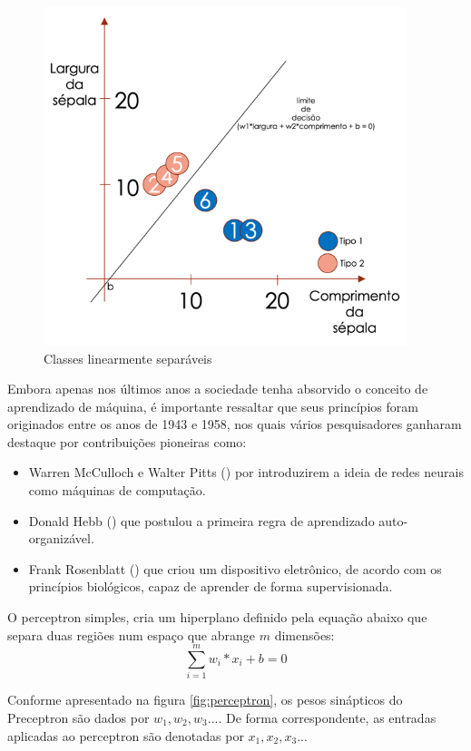 \begin{figure}[H]
  \centering
  \includegraphics[width=300pt]{figuras/classes_linearmente_separaveis.png}
  \caption{Classes linearmente separáveis}
  \label{fig:classes_separadas}
\end{figure}

Embora apenas nos últimos anos a sociedade tenha absorvido o conceito de aprendizado de máquina, é importante ressaltar que seus princípios foram originados entre os anos de 1943 e 1958, nos quais vários pesquisadores ganharam destaque por contribuições pioneiras como:
\begin{itemize}
    \itemsep-1em
    \item Warren McCulloch e Walter Pitts
    (\citeyear{mcculloch1943logical}) por introduzirem a ideia de redes neurais como máquinas de computação.
    \item Donald Hebb (\citeyear{hebb1949organization}) que postulou a primeira regra de aprendizado auto-organizável.
    \item Frank Rosenblatt (\citeyear{rosenblatt1958two}) que criou um dispositivo eletrônico, de acordo com os princípios biológicos, capaz de aprender de forma supervisionada.
\end{itemize}

O perceptron simples, cria um hiperplano definido pela equação abaixo que separa duas regiões num espaço que abrange $m$ dimensões:
\begin{equation*}
    \sum_{i=1}^{m} w_i * x_i + b = 0
\end{equation*}

Conforme apresentado na figura \ref{fig:perceptron}, os pesos sinápticos do Preceptron são dados por $w_1, w_2, w_3...$. De forma correspondente, as entradas aplicadas ao perceptron são denotadas por $x_1, x_2, x_3...$

